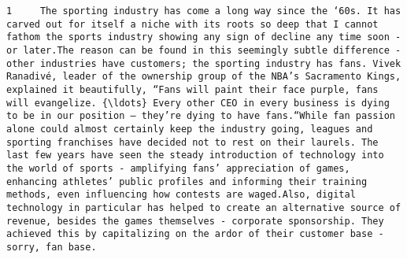 \documentclass[11pt]{article}
\begin{document}
\begin{Verbatim}[commandchars=\\\{\}]
         1     The sporting industry has come a long way since the ‘60s. It has carved out for itself a niche with its roots so deep that I cannot fathom the sports industry showing any sign of decline any time soon - or later.The reason can be found in this seemingly subtle difference - other industries have customers; the sporting industry has fans. Vivek Ranadivé, leader of the ownership group of the NBA’s Sacramento Kings, explained it beautifully, “Fans will paint their face purple, fans will evangelize. {\ldots} Every other CEO in every business is dying to be in our position — they’re dying to have fans.“While fan passion alone could almost certainly keep the industry going, leagues and sporting franchises have decided not to rest on their laurels. The last few years have seen the steady introduction of technology into the world of sports - amplifying fans’ appreciation of games, enhancing athletes’ public profiles and informing their training methods, even influencing how contests are waged.Also, digital technology in particular has helped to create an alternative source of revenue, besides the games themselves - corporate sponsorship. They achieved this by capitalizing on the ardor of their customer base - sorry, fan base.                                                                                                                                                                                                                                                                                                                                                                                                                                                                                                                                                                                                                                                                                                                                                                                                                                                                                                                                                                                                                                                                                                                                                                                                                                                                                                                                                                                                                                                                                                                                                                                                                                                                                                                                                                                                                                                                                                                                                                                                                                                                                                                               
\end{Verbatim}
\end{document}
